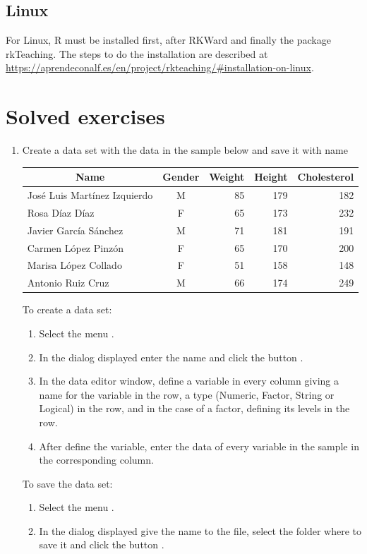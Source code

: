 \subsection{Linux}
For Linux, R must be installed first, after RKWard and finally the package rkTeaching. The steps to do the installation are described at \url{https://aprendeconalf.es/en/project/rkteaching/#installation-on-linux}.


\section{Solved exercises}
\begin{enumerate}[leftmargin=*]
\item Create a data set with the data in the sample below and save it with name 
\begin{center}
\begin{tabular}{|l|c|r|r|r|}
\hline
\multicolumn{1}{|c|}{Name} & \multicolumn{1}{c|}{Gender} & \multicolumn{1}{c|}{Weight} & \multicolumn{1}{c|}{Height} &
\multicolumn{1}{c|}{Cholesterol}\\
\hline
José Luis Martínez Izquierdo  & M &  85 & 179 & 182\\
Rosa Díaz Díaz & F & 65 & 173 & 232\\
Javier García Sánchez  & M & 71 & 181 & 191\\
Carmen López Pinzón & F &  65 & 170 & 200\\
Marisa López Collado & F &  51 & 158 & 148\\
Antonio Ruiz Cruz & M & 66 & 174 & 249\\
\hline
\end{tabular}
\end{center}

\begin{indication}
To create a data set:
\begin{enumerate}
\item Select the menu .
\item In the dialog displayed enter the name  and click the button .
\item In the data editor window, define a variable in every column giving a name for the variable in the 
row, a type (Numeric, Factor, String or Logical) in the  row, and in the case of a factor, defining its
levels in the  row.
\item After define the variable, enter the data of every variable in the sample in the corresponding column.
\end{enumerate}
To save the data set:
\begin{enumerate}
\item Select the menu .
\item In the dialog displayed give the name  to the file, select the folder where to save it
and click the button .
\end{enumerate}
\end{indication}


\end{enumerate}
